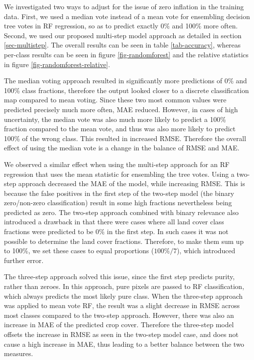\documentclass[review,authoryear,3p]{elsarticle}
\begin{document}
We investigated two ways to adjust for the issue of zero inflation in the training data.
First, we used a median vote instead of a mean vote for ensembling decision tree votes in \gls{RF} regression, so as to predict exactly 0\% and 100\% more often.
Second, we used our proposed multi-step model approach as detailed in section \ref{sec-multistep}.
The overall results can be seen in table \ref{tab-accuracy}, whereas per-class results can be seen in figure \ref{fig-randomforest} and the relative statistics in figure \ref{fig-randomforest-relative}.

The median voting approach resulted in significantly more predictions of 0\% and 100\% class fractions, therefore the output looked closer to a discrete classification map compared to mean voting.
Since these two most common values were predicted precisely much more often, \gls{MAE} reduced.
However, in cases of high uncertainty, the median vote was also much more likely to predict a 100\% fraction compared to the mean vote, and thus was also more likely to predict 100\% of the wrong class.
This resulted in increased \gls{RMSE}.
Therefore the overall effect of using the median vote is a change in the balance of \gls{RMSE} and \gls{MAE}.

We observed a similar effect when using the multi-step approach for an \gls{RF} regression that uses the mean statistic for ensembling the tree votes.
Using a two-step approach decreased the \gls{MAE} of the model, while increasing \gls{RMSE}.
This is because the false positives in the first step of the two-step model (the binary zero/non-zero classification) result in some high fractions nevertheless being predicted as zero.
The two-step approach combined with binary relevance also introduced a drawback in that there were cases where all land cover class fractions were predicted to be 0\% in the first step.
In such cases it was not possible to determine the land cover fractions.
Therefore, to make them sum up to 100\%, we set these cases to equal proportions ($100\% / 7$), which introduced further error.

The three-step approach solved this issue, since the first step predicts purity, rather than zeroes.
In this approach, pure pixels are passed to \gls{RF} classification, which always predicts the most likely pure class.
When the three-step approach was applied to mean vote \gls{RF}, the result was a slight decrease in \gls{RMSE} across most classes compared to the two-step approach.
However, there was also an increase in \gls{MAE} of the predicted crop cover.
Therefore the three-step model offsets the increase in \gls{RMSE} as seen in the two-step model case, and does not cause a high increase in \gls{MAE}, thus leading to a better balance between the two measures.
\end{document}

